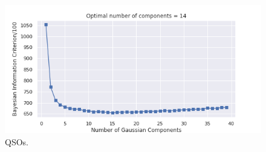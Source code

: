 \begin{figure}
  \centering
  \includegraphics[width=\textwidth]{images/gmm/qso_bic.png}
  \caption{QSOs.}
  \label{fig:qso_bic}
\end{figure}

